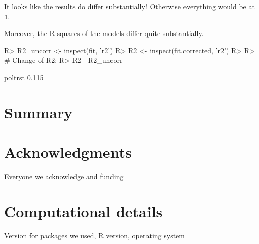 \documentclass[
]{jss}
\begin{document}
It looks like the results do differ substantially! Otherwise everything
would be at \texttt{1}.

Moreover, the R-squares of the models differ quite substantially.

\begin{CodeChunk}

\begin{CodeInput}
R> R2_uncorr <- inspect(fit, 'r2')
R> R2 <- inspect(fit.corrected, 'r2')
R> 
R> # Change of R2:
R> R2 - R2_uncorr
\end{CodeInput}

\begin{CodeOutput}
poltrst 
  0.115 
\end{CodeOutput}
\end{CodeChunk}

\hypertarget{summary}{%
\section{Summary}\label{summary}}

\hypertarget{acknowledgments}{%
\section{Acknowledgments}\label{acknowledgments}}

Everyone we acknowledge and funding

\hypertarget{computational-details}{%
\section{Computational details}\label{computational-details}}

Version for packages we used, R version, operating system

\renewcommand\refname{References}

\end{document}
